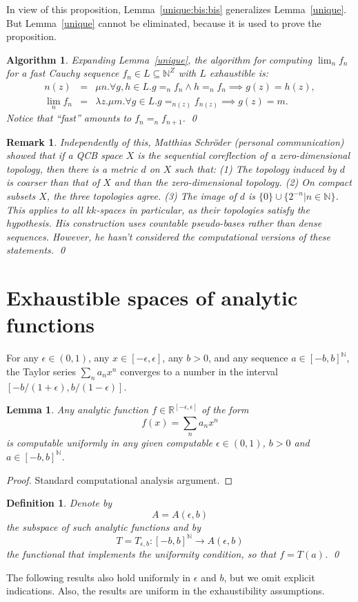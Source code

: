 \documentclass[10pt]{article}
\newtheorem{lemma}[cor]{Lemma}
\newtheorem{Def}[cor]{Definition}
\newtheorem{Alg}[cor]{Algorithm}
\newtheorem{Rem}[cor]{Remark}
\newenvironment{definition}{\begin{Def}\em}{\end{Def}}
\newenvironment{algorithm}{\begin{Alg}\em}{\end{Alg}}
\newenvironment{rem}{\begin{Rem}\em}{\end{Rem}}
\newcommand{\N}{\mathbb{N}}
\newcommand{\R}{\mathbb{R}}
\begin{document}
In view of this proposition, Lemma~\ref{unique:bis:bis} generalizes
Lemma~\ref{unique}. But Lemma~\ref{unique} cannot be eliminated,
because it is used to prove the proposition.  
\begin{algorithm}
  Expanding Lemma~\ref{unique}, the algorithm for computing
  $\lim_n f_n$ for a fast Cauchy sequence $f_n \in L \subseteq \N^Z$
  with $L$ exhaustible is:
\begin{eqnarray*}
  n(z) & = & \mu n.\forall g,h \in L.  g =_n f_n \wedge h =_n f_n \implies g(z) = h(z), \\
\lim_n f_n& = & \lambda z.\mu m.  \forall g \in L.  g =_{n(z)} f_{n(z)} \implies g(z)=m. 
\end{eqnarray*}
Notice that ``fast'' amounts to $f_n =_n f_{n+1}$. \qed
\end{algorithm}
\pagebreak[3]
\begin{rem}
  Independently of this, Matthias Schr\"oder (personal communication)
  showed that if a QCB space $X$ is the sequential coreflection of a
  zero-dimensional topology, then there is a metric $d$ on $X$ such
  that: (1) The topology induced by $d$ is coarser than that of $X$
  and than the zero-dimensional topology. (2) On compact subsets $X$,
  the three topologies agree.  (3) The image of $d$ is $\{ 0 \} \cup
  \{ 2^{-n} | n \in \N \}$.  This applies to all $kk$-spaces in
  particular, as their topologies satisfy the hypothesis. His
  construction uses countable pseudo-bases rather than dense
  sequences.  However, he hasn't considered the computational versions
  of these statements. \qed
\end{rem}


\section{Exhaustible spaces of analytic functions} \label{applications}

For any $\epsilon \in (0,1)$, any $x \in [-\epsilon,\epsilon]$, any $b>0$,
and any sequence $a \in [-b,b]^\N$, the Taylor series $\sum_n
a_n x^n$ converges to a number in the interval
$[-b/(1+\epsilon),b/(1-\epsilon)]$. 

\begin{lemma} \label{uniform:analytic}
  Any analytic function $f \in \R^{[-\epsilon,\epsilon]}$ of the form
  \[
  f(x) = \sum_n a_n x^n
  \]
  is computable uniformly in any given computable $\epsilon \in (0,1)$, $b >
  0$ and $a \in [-b,b]^\N$.
\end{lemma}
\begin{proof}
  Standard computational analysis argument. 
\end{proof}
\begin{definition}
  Denote by \[ A = A(\epsilon,b)\] the subspace of such analytic
  functions and by \[ T = T_{\epsilon,b} \colon [-b,b]^\N \to
  A(\epsilon,b)\] the functional that implements the uniformity
  condition, so that $f = T(a)$. \qed
\end{definition}
The following results also hold uniformly in $\epsilon$ and $b$,
but we omit explicit indications. Also, the results are uniform in the
exhaustibility assumptions. 
\end{document}
